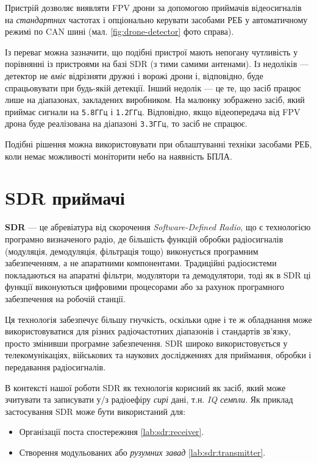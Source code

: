 \documentclass{article}
\begin{document}
Пристрій дозволяє виявляти FPV дрони за допомогою приймачів відеосигналів на \textit{стандартних} частотах і опціонально керувати засобами РЕБ у автоматичному режимі по CAN шині (мал. \ref{fig:drone-detector} фото справа).

Із переваг можна зазначити, що подібні пристрої мають непогану чутливість у порівнянні із пристроями на базі SDR (з тими самими антенами). Із недоліків — детектор не \textit{вміє} відрізняти дружні і ворожі дрони і, відповідно, буде спрацьовувати при будь-якій детекції. Інший недолік — це те, що засіб працює лише на діапазонах, закладених виробником. На малюнку зображено засіб, який приймає сигнали на \texttt{5.8ГГц} і \texttt{1.2ГГц}. Відповідно, якщо відеопередача від FPV дрона буде реалізована на діапазоні \texttt{3.3ГГц}, то засіб не спрацює.

Подібні рішення можна використовувати при облаштуванні техніки засобами РЕБ, коли немає можливості моніторити небо на наявність БПЛА.

\section{SDR приймачі}
\label{sec:sdr}
\textbf{SDR} --- це абревіатура від скорочення \textit{Software-Defined Radio}, що є технологією програмно визначеного радіо, де більшість функцій обробки радіосигналів (модуляція, демодуляція, фільтрація тощо) виконується програмним забезпеченням, а не апаратними компонентами. Традиційні радіосистеми покладаються на апаратні фільтри, модулятори та демодулятори, тоді як в SDR ці функції виконуються цифровими процесорами або за рахунок програмного забезпечення на робочій станції.

Ця технологія забезпечує більшу гнучкість, оскільки одне і те ж обладнання може використовуватися для різних радіочастотних діапазонів і стандартів зв'язку, просто змінивши програмне забезпечення. SDR широко використовується у телекомунікаціях, військових та наукових дослідженнях для приймання, обробки і передавання радіосигналів.

В контексті нашої роботи SDR як технологія корисний як засіб, який може зчитувати та записувати у/з радіоефіру \textit{сирі} дані, т.н. \textit{IQ семпли}. Як приклад застосування SDR може бути використаний для:

\begin{itemize}[noitemsep, topsep=8pt]
\item Організації поста спостережння \ref{lab:sdr:receiver}.
\item Створення модульованих або \textit{рузумних завад} \ref{lab:sdr:transmitter}.
\end{itemize}
\end{document}
